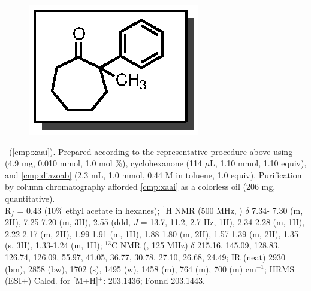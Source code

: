 \vspace{10pt}
\begin{figure}
  \vspace{-15pt}
  \begin{center}
    \includegraphics[scale=0.8]{chp_asymmetric/images/xaai}
  \end{center}
  \vspace{-30pt}
\end{figure}\noindent \textbf{\CMPxaai}\ (\ref{cmp:xaai}). Prepared
according to the representative procedure above using  (4.9 mg,
0.010 mmol, 1.0 mol \%), cyclohexanone (114 $\mu$L, 1.10 mmol, 1.10 equiv), and
\ref{cmp:diazoab} (2.3 mL, 1.0 mmol, 0.44 M in toluene, 1.0 equiv). Purification
by column chromatography afforded \ref{cmp:xaai} as a colorless oil (206 mg,
quantitative). \\
R$_f$ = 0.43 (10\% ethyl acetate in hexanes); $^1$H NMR (500 MHz, )
$\delta$ 7.34- 7.30 (m, 2H), 7.25-7.20 (m, 3H), 2.55 (ddd, \textit{J} = 13.7,
11.2, 2.7 Hz, 1H), 2.34-2.28 (m, 1H), 2.22-2.17 (m, 2H), 1.99-1.91 (m, 1H),
1.88-1.80 (m, 2H), 1.57-1.39 (m, 2H), 1.35 (s, 3H), 1.33-1.24 (m, 1H); $^{13}$C
NMR (, 125 MHz) $\delta$ 215.16, 145.09, 128.83, 126.74, 126.09,
55.97, 41.05, 36.77, 30.78, 27.10, 26.68, 24.49; IR (neat) 2930 (bm), 2858 (bw),
1702 (s), 1495 (w), 1458 (m), 764 (m), 700 (m) cm$^{-1}$; HRMS (ESI+) Calcd. for
 [M+H]$^+$: 203.1436; Found 203.1443.

